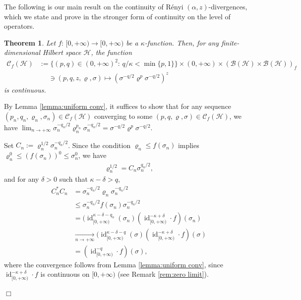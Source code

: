 \documentclass[unsortedaddress,superscriptaddress,pra,notitlepage]{revtex4}
\newtheorem{theorem}[definition]{Theorem}
\newenvironment{proof}[1][Proof]{\begin{trivlist}
\item[\hskip \labelsep {\bfseries #1}]}{\hfill$\Box$\end{trivlist}}
\newcommand{\nn}{\nonumber \\}
\def\B{{\mathcal B}}
\def\C{{\mathcal C}}
\def\rho{\varrho}
\def\hil{{\mathcal H}}
\def\nn{\nonumber}
\def\pwr{\kappa}
\newcommand{\ds}{\mbox{ }\mbox{ }}
\DeclareMathOperator{\id}{id}
\begin{document}
The following is our main result on the continuity of R\'enyi $(\alpha,z)$-divergences, which we state and prove in the stronger form of continuity on the level of operators. 

\begin{theorem}\label{thm:main}
Let $f:\,[0,+\infty)\to[0,+\infty)$ be a 
$\pwr$-function.
Then,
for any finite-dimensional Hilbert space $\hil$, the function
\begin{align*}
\C_{f}(\hil)&:=\{(p,q)\in(0,+\infty)^2:\,q/\pwr<\min\{p,1\}\}\times
(0,+\infty)\times(\B(\hil)\times\B(\hil))_{f}\\
&\ds\ni(p,q,z,\rho,\sigma)\mapsto(\sigma^{-q/2}\rho^p\sigma^{-q/2})^z
\end{align*}
is continuous. 
\end{theorem}
\begin{proof}
By Lemma \ref{lemma:uniform conv},
it suffices to show that for
any sequence $(p_n,q_n,\rho_n,\sigma_n)\in\C_{f}(\hil)$
converging to some $(p,q,\rho,\sigma)\in\C_{f}(\hil)$, we have 
$\lim_{n\to+\infty}\sigma_n^{-q_n/2}\rho_n^{p_n}\sigma_n^{-q_n/2}= \sigma^{-q/2}\rho^p\sigma^{-q/2}$. 

Set $C_n:=\rho_n^{1/2}\sigma_n^{-q_n/2}$.
Since the condition $\rho_n\le f(\sigma_n)$ implies 
$\rho_n^0\le (f(\sigma_n))^0\le\sigma_n^0$, we have
\begin{align}\label{contt proof1}
\rho_n^{1/2}=C_n\sigma_n^{q_n/2},
\end{align}
and for any $\delta>0$ such that $\kappa-\delta>q$, 
\begin{align}
 C_n^*C_n&=
\sigma_n^{-q_n/2}\rho_n\sigma_n^{-q_n/2}\nn\\
&\le
\sigma_n^{-q_n/2}f(\sigma_n)\sigma_n^{-q_n/2}\nn\\
&=
(\id_{[0,+\infty)}^{\kappa-\delta-q_n}(\sigma_n)
(\id_{[0,+\infty)}^{-\kappa+\delta}\cdot f)(\sigma_n)\nn\\
&\xrightarrow[n\to+\infty]{}
(\id_{[0,+\infty)}^{\kappa-\delta-q}(\sigma)
(\id_{[0,+\infty)}^{-\kappa+\delta}\cdot f)(\sigma)\nn\\
&=
(\id_{[0,+\infty)}^{-q}\cdot f)(\sigma),\label{contt proof2}
\end{align}
where the convergence follows from Lemma \ref{lemma:uniform conv}, 
since
$\id_{[0,+\infty)}^{-\pwr+\delta}\cdot f$ is continuous on $[0,+\infty)$
(see Remark \eqref{rem:zero limit}).


\end{proof}
\end{document}

